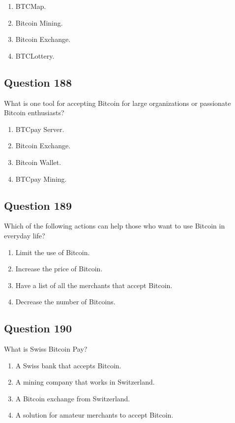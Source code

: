 \documentclass[12pt,a4paper]{article}
\begin{document}
\begin{enumerate}[label=\Alph*., leftmargin=*]
\item BTCMap.
\item Bitcoin Mining.
\item Bitcoin Exchange.
\item BTCLottery.
\end{enumerate}

\bigskip


\subsection*{Question 188}
What is one tool for accepting Bitcoin for large organizations or passionate Bitcoin enthusiasts?

\begin{enumerate}[label=\Alph*., leftmargin=*]
\item BTCpay Server.
\item Bitcoin Exchange.
\item Bitcoin Wallet.
\item BTCpay Mining.
\end{enumerate}

\bigskip


\subsection*{Question 189}
Which of the following actions can help those who want to use Bitcoin in everyday life?

\begin{enumerate}[label=\Alph*., leftmargin=*]
\item Limit the use of Bitcoin.
\item Increase the price of Bitcoin.
\item Have a list of all the merchants that accept Bitcoin.
\item Decrease the number of Bitcoins.
\end{enumerate}

\bigskip


\subsection*{Question 190}
What is Swiss Bitcoin Pay?

\begin{enumerate}[label=\Alph*., leftmargin=*]
\item A Swiss bank that accepts Bitcoin.
\item A mining company that works in Switzerland.
\item A Bitcoin exchange from Switzerland.
\item A solution for amateur merchants to accept Bitcoin.
\end{enumerate}
\end{document}
